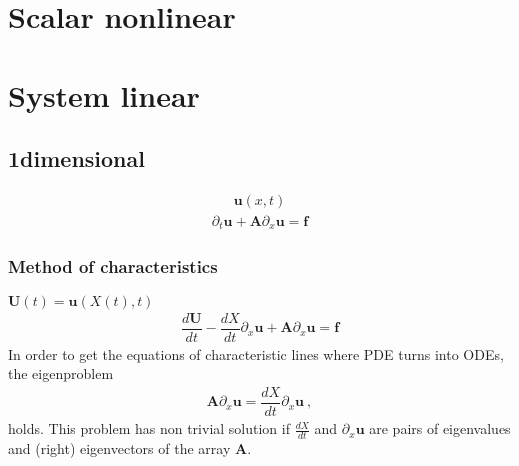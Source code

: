 \documentclass[letterpaper,10pt,english]{jupyterBook}
\begin{document}
\section{Scalar non\sphinxhyphen{}linear}
\label{\detokenize{ch/pde/hyperbolic:scalar-non-linear}}\label{\detokenize{ch/pde/hyperbolic:pde-hyperbolic-scalar-non-linear}}

\section{System linear}
\label{\detokenize{ch/pde/hyperbolic:system-linear}}\label{\detokenize{ch/pde/hyperbolic:pde-hyperbolic-system-linear}}

\subsection{1\sphinxhyphen{}dimensional}
\label{\detokenize{ch/pde/hyperbolic:id1}}\begin{equation*}
\begin{split}\mathbf{u}(x,t)\end{split}
\end{equation*}\begin{equation*}
\begin{split}\partial_t \mathbf{u} + \mathbf{A} \partial_x \mathbf{u} = \mathbf{f}\end{split}
\end{equation*}

\subsubsection{Method of characteristics}
\label{\detokenize{ch/pde/hyperbolic:method-of-characteristics}}
\sphinxAtStartPar
{} \(\mathbf{U}(t) = \mathbf{u}(X(t), t)\)
\begin{equation*}
\begin{split}\dfrac{d \mathbf{U}}{dt} - \dfrac{d X}{dt} \partial_x \mathbf{u} + \mathbf{A} \partial_x \mathbf{u} = \mathbf{f}\end{split}
\end{equation*}
\sphinxAtStartPar
In order to get the equations of characteristic lines where PDE turns into ODEs, the eigenproblem
\begin{equation*}
\begin{split}\mathbf{A} \partial_x \mathbf{u} = \dfrac{d X}{d t} \partial_x \mathbf{u} \ ,\end{split}
\end{equation*}
\sphinxAtStartPar
holds. This problem has non trivial solution if \(\frac{d X}{dt}\) and \(\partial_x \mathbf{u}\) are pairs of eigenvalues and (right) eigenvectors of the array \(\mathbf{A}\).
\end{document}

